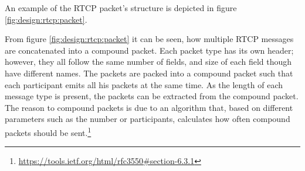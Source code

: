 An example of the RTCP packet's structure is depicted in figure \ref{fig:design:rtcp:packet}.

From figure \ref{fig:design:rtcp:packet} it can be seen, how multiple RTCP messages are concatenated into a compound packet. Each packet type has its own header; however, they all follow the same number of fields, and size of each field though have different names. The packets are packed into a compound packet such that each participant emits all his packets at the same time. As the length of each message type is present, the packets can be extracted from the compound packet. The reason to compound packets is due to an algorithm that, based on different parameters such as the number or participants, calculates how often compound packets should be sent.\footnote{\url{https://tools.ietf.org/html/rfc3550\#section-6.3.1}}

